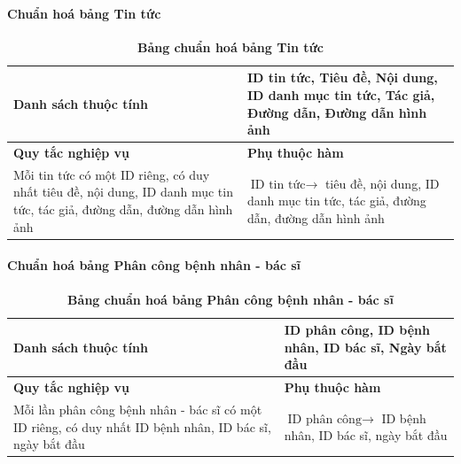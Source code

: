 \paragraph{Chuẩn hoá bảng Tin tức}
\mbox{}

\begin{table}[H]
  \caption{\bfseries \fontsize{12pt}{0pt}\selectfont Bảng chuẩn hoá bảng Tin tức}
  \centering
  \begin{tabularx}{0.9\textwidth}{|X|X|}
    \hline
    \textbf{Danh sách thuộc tính} & ID tin tức, Tiêu đề, Nội dung, ID danh mục tin tức, Tác giả, Đường dẫn,
    Đường dẫn hình ảnh \\ %
    \hline
    \textbf{Quy tắc nghiệp vụ} & \textbf{Phụ thuộc hàm} \\
    \hline
    Mỗi tin tức có một ID riêng, có duy nhất tiêu đề, nội dung, ID danh mục tin tức, tác giả, đường dẫn,
    đường dẫn hình ảnh & \parbox[t]{\linewidth}{$\text{ID tin tức} \rightarrow$ tiêu đề, nội dung, ID danh mục tin tức, tác giả, đường dẫn,
    đường dẫn hình ảnh} \\
    \hline
     \\
     \\
    \hline
  \end{tabularx}
\end{table}



\paragraph{Chuẩn hoá bảng Phân công bệnh nhân - bác sĩ}
\mbox{}

\begin{table}[H]
  \caption{\bfseries \fontsize{12pt}{0pt}\selectfont Bảng chuẩn hoá bảng Phân công bệnh nhân - bác sĩ}
  \centering
  \begin{tabularx}{0.9\textwidth}{|X|X|}
    \hline
    \textbf{Danh sách thuộc tính} & ID phân công, ID bệnh nhân, ID bác sĩ, Ngày bắt
    đầu \\ %
    \hline
    \textbf{Quy tắc nghiệp vụ} & \textbf{Phụ thuộc hàm} \\
    \hline
    Mỗi lần phân công bệnh nhân - bác sĩ có một ID riêng, có duy nhất ID bệnh nhân, ID bác sĩ, ngày bắt
    đầu & \parbox[t]{\linewidth}{$\text{ID phân công} \rightarrow$ ID bệnh nhân, ID bác sĩ, ngày bắt
    đầu} \\
    \hline
     \\
     \\
    \hline
  \end{tabularx}
\end{table}




